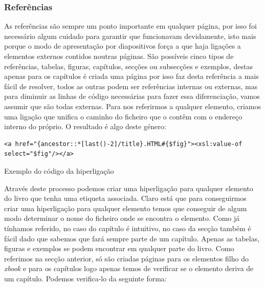 \documentclass[a4paper]{article}
\begin{document}
\subsubsection{Referências}

\hspace{1cm}As referências são sempre um ponto importante em qualquer página, por isso foi necessário algum cuidado para garantir que funcionavam devidamente, isto mais porque o modo de apresentação por diapositivos força a que haja ligações a elementos externos contidos noutras páginas. São possíveis cinco tipos de referências, tabelas, figuras, capítulos, secções ou subsecções e exemplos, destas apenas para os capítulos é criada uma página por isso faz desta referência a mais fácil de
resolver, todos as outras podem ser referências internas ou externas, mas para diminuir as linhas de código necessárias para fazer essa diferenciação, vamos assumir que são todas externas. Para nos referirmos a qualquer elemento, criamos uma ligação que unifica o caminho do ficheiro que o contêm com o endereço interno do próprio. O resultado é algo deste género:\\

\begin{small}                        
\begin{lstlisting}
<a href="{ancestor::*[last()-2]/title}.HTML#{$fig}"><xsl:value-of select="$fig"/></a>
\end{lstlisting}
\end{small}
\begin{footnotesize}
\begin{center}
\caption{Exemplo do código da hiperligação}
\end{center}
\end{footnotesize}

\hspace{1cm}Através deste processo podemos criar uma hiperligação para qualquer elemento do livro que tenha uma etiqueta associada. Claro está que para conseguirmos criar uma hiperligação para qualquer elemento temos que conseguir de algum modo determinar o nome do ficheiro onde se encontra o elemento. Como já tínhamos referido, no caso do capítulo é intuitivo, no caso da secção também é fácil dado que sabemos que fará sempre parte de um capítulo. Apenas as tabelas, figuras e exemplos se podem encontrar em qualquer parte do livro. Como referimos na secção anterior, só são criadas páginas para os elementos filho do \emph{xbook} e para os capítulos logo apenas temos de verificar se o elemento deriva de um capítulo. Podemos verifica-lo da seguinte forma:\\
\end{document}
